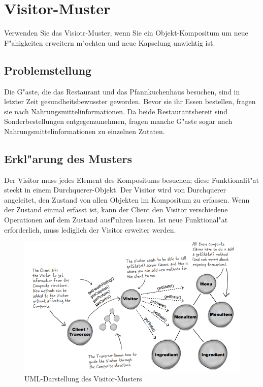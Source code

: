 \section{Visitor-Muster}
Verwenden Sie das Visiotr-Muster, wenn Sie ein Objekt-Kompositum um neue F"ahigkeiten erweitern m"ochten und neue Kapselung unwichtig ist.

\subsection{Problemstellung}
Die G"aste, die das Restaurant und das Pfannkuchenhaus besuchen, sind in letzter Zeit gesundheitsbewusster geworden. Bevor sie ihr Essen bestellen, fragen sie nach Nahrungsmittelinformationen. Da beide Restaurantsbereit sind Sonderbestellungen entgegenzunehmen, fragen manche G"aste sogar nach Nahrungsmittelinformationen zu einzelnen Zutaten.

\subsection{Erkl"arung des Musters}
Der Visitor muss jedes Element des Kompositums besuchen; diese Funktionalit"at steckt in einem Durchquerer-Objekt. Der Visitor wird von Durchquerer angeleitet, den Zustand von allen Objekten im Kompositum zu erfassen. Wenn der Zustand einmal erfasst ist, kann der Client den Visitor verschiedene Operationen auf dem Zustand ausf"uhren lassen. Ist neue Funktional"at erforderlich, muss lediglich der Visitor erweiter werden.

\begin{figure}
	\centering
	\includegraphics[width=\linewidth]{visitor/img/visitorUML}
	\caption{UML-Darstellung des Visitor-Musters}
	\label{fig:visitorUML}
\end{figure}

